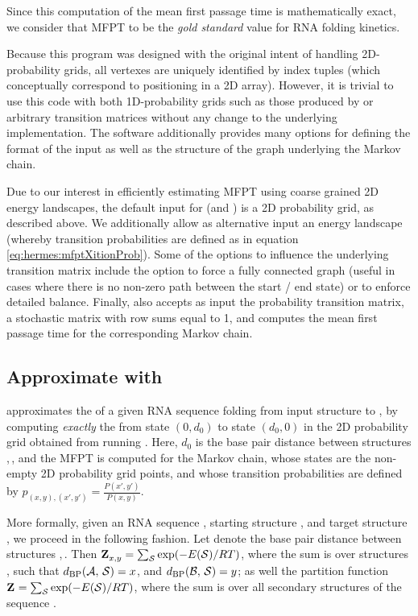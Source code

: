Since this computation of the
mean first passage time is mathematically exact, we consider that MFPT
to be the {\em gold standard} value for RNA folding kinetics.

Because this program was designed with the original intent
of handling 2D-probability grids, all vertexes are uniquely identified
by index tuples (which conceptually correspond to positioning in a 2D
array). However, it is trivial to use this code with both
1D-probability grids such as those produced by \fftbor
\cite{Senter.po12} or arbitrary transition matrices without any change
to the underlying implementation. The software additionally provides
many options for defining the format of the input as well as the
structure of the graph underlying the
Markov chain.

Due to our interest in efficiently estimating MFPT using coarse grained 2D
energy landscapes, the default input for \rnamfpt (and \rnaeq) is a 2D
probability grid, as described above. We additionally allow as alternative input
an energy landscape (whereby transition probabilities are defined as in
equation \ref{eq:hermes:mfptXitionProb}).
Some of the options to influence the underlying transition matrix
include the option to force a fully
connected graph (useful in cases where there is no non-zero path
between the start / end state) or to enforce detailed balance.
Finally, \rnamfpt also accepts as input the probability transition matrix,
a stochastic matrix with row sums equal to 1, and computes the mean
first passage time for the corresponding Markov chain.

\subsection{Approximate \mfpt with \fftmfpt}
\label{subsec:hermes:fftmfpt}

\fftmfpt approximates the \mfpt of a given RNA
sequence folding from input structure \strA to \strB, by
computing {\em exactly} the \mfpt from state $(0,d_0)$ to state
$(d_0,0)$ in the 2D probability grid obtained from running
\ffttwo. Here, $d_0$ is the base pair distance between structures
\strA,\,\strB, and the MFPT is computed for the Markov chain, whose states are
the non-empty 2D probability grid points, and whose transition
probabilities are defined by $p_{(x,y),(x',y')} =
\frac{P(x',y')}{P(x,y)}$.

More formally, given an RNA sequence \seq, starting structure \strA, and
target structure \strB, we proceed in the following fashion. Let \dBP{\strA}{\strB} denote the base pair distance between structures
\strA,\,\strB. Then ${\bf Z}^{}_{x,y} = \sum_\mathcal S \exp(-E(\mathcal S)/RT)$, where the sum is over
structures \str, such that $d_{\text{BP}}(\mathcal A,\,\mathcal S) = x$, and
$d_{\text{BP}}(\mathcal B,\,\mathcal S) = y$; as
well the partition function ${\bf Z}^{}_{} = \sum_\mathcal S \exp(-E(\mathcal S)/RT)$, where the sum
is over all secondary structures \str of the sequence \seq.

